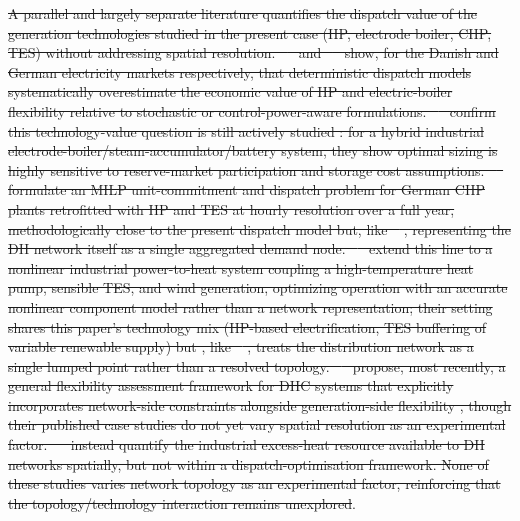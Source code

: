 \documentclass[a4paper,fleqn]{cas-sc} %
\providecommand{\citet}[1]{\cite{#1}} %
\providecommand{\DIFdel}[1]{{\protect\color{red}\sout{#1}}} %
\providecommand{\DIFdelbegin}{} %
\providecommand{\DIFdelend}{} %
\begin{document}
\DIFdel{A parallel and largely separate literature quantifies the dispatch
value of the generation technologies studied in the present case
(HP, electrode boiler, CHP, TES) without addressing spatial
resolution. \mbox{%
\citet{Nielsen2016} }\hskip0pt%
and \mbox{%
\citet{Boettger2015} }\hskip0pt%
show, for
the Danish and German electricity markets respectively, that
deterministic dispatch models systematically overestimate the economic value of HP and electric-boiler flexibility relative to
stochastic or control-power-aware formulations. \mbox{%
\citet{Galteland2026} }\hskip0pt%
confirm this technology-value
question is still actively studied : for a hybrid industrial
electrode-boiler/steam-accumulator/battery system, they show optimal
sizing is highly sensitive to reserve-market participation and
storage cost assumptions. \mbox{%
\citet{Mollenhauer2018} }\hskip0pt%
formulate an MILP
unit-commitment and dispatch problem for German CHP plants
retrofitted with HP and TES at hourly resolution over a full year,
methodologically close to the present dispatch model but, like
\mbox{%
\citet{Schweiger2017_p2h,Averfalk2017,David2017}}\hskip0pt%
, representing the DH network itself as a single aggregated demand
node. \mbox{%
\citet{Walden2023} }\hskip0pt%
extend this line to a nonlinear industrial
power-to-heat system coupling a high-temperature heat pump, sensible
TES, and wind generation, optimizing operation with an accurate
nonlinear component model rather than a network representation; their setting shares this paper's technology mix (HP-based
electrification, TES buffering of variable renewable supply) but ,
like \mbox{%
\citet{Mollenhauer2018}}\hskip0pt%
, treats the distribution network as a single lumped point rather than a resolved topology.
\mbox{%
\citet{Riedl2026} }\hskip0pt%
propose, most recently, a general flexibility
assessment framework for DHC systems that explicitly incorporates
network-side constraints alongside generation-side flexibility ,
though their published
case studies do not yet vary spatial resolution as an experimental
factor. \mbox{%
\citet{Buhler2017} }\hskip0pt%
instead quantify the industrial excess-heat
resource available to DH networks spatially, but not within a
dispatch-optimisation  framework. None of these studies varies
network topology as an experimental factor, reinforcing that the
topology/technology interaction remains unexplored}\DIFdelend . \DIFdelbegin %
\end{document}
